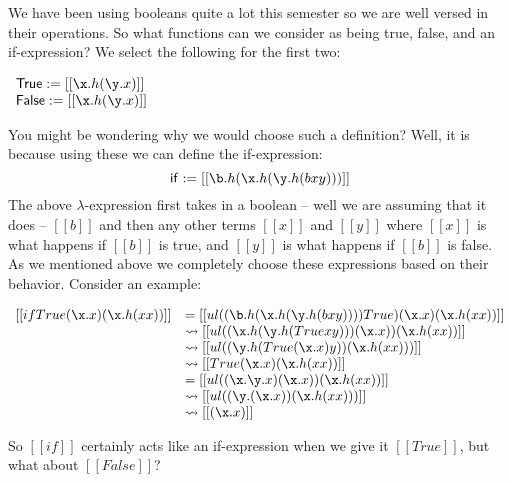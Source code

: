 \documentclass{article}
\newcommand {\redto}[0]{\rightsquigarrow}
\begin{document}
We have been using booleans quite a lot this semester so we are well
versed in their operations.  So what functions can we consider as
being true, false, and an if-expression?  We select the following for
the first two:
\begin{center}
  \begin{math}
    \begin{array}{lll}
      \mathsf{True}  := [[\x.h(\y.x)]]\\
      \mathsf{False} := [[\x.h(\y.x)]]\\
    \end{array}
  \end{math}
\end{center}
You might be wondering why we would choose such a definition?  Well,
it is because using these we can define the if-expression:
\[ \mathsf{if} := [[\b.h(\x.h(\y.h(b x y)))]] \] The above
$\lambda$-expression first takes in a boolean -- well we are assuming
that it does -- $[[b]]$ and then any other terms $[[x]]$ and $[[y]]$
where $[[x]]$ is what happens if $[[b]]$ is true, and $[[y]]$ is what
happens if $[[b]]$ is false.  As we mentioned above we completely
choose these expressions based on their behavior.  Consider an
example:
\begin{center}
  \begin{math}
    \begin{array}{lll}
      [[if True (\x.x) (\x.h(x x))]] 
      & = [[ul((\b.h(\x.h(\y.h(b x y)))) True) (\x.x) (\x.h(x x))]]\\
      & \redto [[ul((\x.h(\y.h(True x y))) (\x.x)) (\x.h(x x))]]\\
      & \redto [[ul((\y.h(True (\x.x) y)) (\x.h(x x)))]]\\
      & \redto [[True (\x.x) (\x.h(x x)) ]]\\
      & = [[ul((\x.\y.x) (\x.x)) (\x.h(x x)) ]]\\
      & \redto [[ul((\y. (\x.x)) (\x.h(x x))) ]]\\
      & \redto [[(\x.x)]]\\
    \end{array}
  \end{math}
\end{center}
So $[[if]]$ certainly acts like an if-expression when we give it
$[[True]]$, but what about $[[False]]$?
\end{document}
